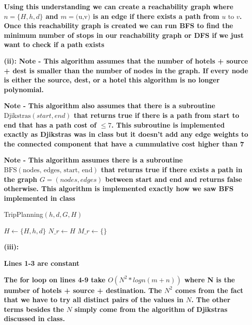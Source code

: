 \documentclass[addpoints]{exam}
\begin{document}
\begin{questions}
\textbf{Using this understanding we can create a reachability graph where $n = \{H,h,d\} $ and $m = \text{(u,v)}$ is an edge if there exists a path from $u \text{ to } v$. Once this reachability graph is created we can run BFS to find the minimum number of stops in our reachability graph or DFS if we just want to check if a path exists}

\textbf{(ii): Note - This algorithm assumes that the number of hotels + source + dest is smaller than the number of nodes in the graph. If every node is either the source, dest, or a hotel this algorithm is no longer polynomial.}

\textbf{Note - This algorithm also assumes that there is a subroutine $\text{Djikstras}(start, end)$ that returns true if there is a path from start to end that has a path cost of $\le 7$. This subroutine is implemented exactly as Djikstras was in class but it doesn't add any edge weights to the connected component that have a cummulative cost higher than 7}

\textbf{Note - This algorithm assumes there is a subroutine $\text{BFS}(\text{nodes, edges, start, end})$ that returns true if there exists a path in the graph $G=(nodes, edges)$ between start and end and returns false otherwise. This algorithm is implemented exactly how we saw BFS implemented in class}

\begin{algorithm}
\caption{TripPlanning$(h,d,G,H)$}\label{alg:cap}
\begin{algorithmic}[1]
\State $H \gets \{H,h,d\}$ 
\State $N\_r \gets H$ 
\State $M\_r \gets \{\}$  
\EndIf
\EndFor \\
\end{algorithmic}
\end{algorithm}

\textbf{(iii): }

\textbf{Lines 1-3 are constant}

\textbf{The for loop on lines 4-9 take $O(N^2 * logn(m+n))$  where N is the number of hotels + source + destination. The $N^2$ comes from the fact that we have to try all distinct pairs of the values in $N$. The other terms besides the $N$ simply come from the algorithm of Djikstras discussed in class.}


\end{questions}
\end{document}
